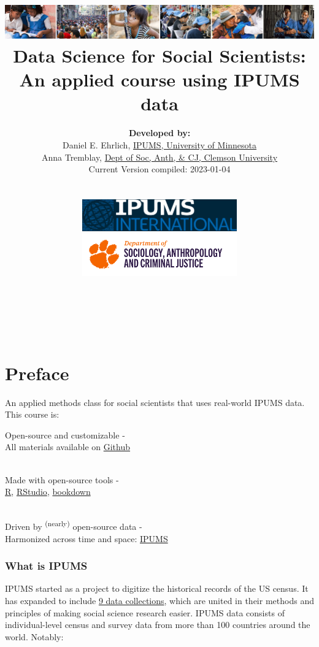 \documentclass[
]{book}
\title{\includegraphics{ipums_banner.png}\\
Data Science for Social Scientists:\\
An applied course using IPUMS data }
\author{\textbf{Developed by:}\\
\hspace*{0.333em}\hspace*{0.333em}Daniel E. Ehrlich, \href{https://international.ipums.org/international/}{IPUMS, University of Minnesota}\\
\hspace*{0.333em}\hspace*{0.333em}Anna Tremblay, \href{https://www.clemson.edu/cbshs/departments/sacj/degrees/anthropology.html}{Dept of Soc, Anth, \& CJ, Clemson University}\\
\hspace*{0.333em}\hspace*{0.333em}Current Version compiled: 2023-01-04\\
\strut \\
\includegraphics[width=0.5\textwidth,height=\textheight]{ipums_i_logo.jpg}\\
\includegraphics[width=0.5\textwidth,height=\textheight]{clemson_logo.png}\\
\strut \\
\strut \\}
\date{}
\begin{document}
\maketitle

{
\setcounter{tocdepth}{1}
\tableofcontents
}
\hypertarget{preface}{%
\chapter*{Preface}\label{preface}}

An applied methods class for social scientists that uses real-world IPUMS data. This course is:

Open-source and customizable -\\
\hspace*{0.333em}\hspace*{0.333em}\hspace*{0.333em}All materials available on \href{https://github.com/ehrlichd/stats_book}{Github}\\
\strut \\
Made with open-source tools -\\
\hspace*{0.333em}\hspace*{0.333em}\href{https://cran.r-project.org/}{R}, \href{https://www.rstudio.com/products/rstudio/}{RStudio}, \href{https://bookdown.org/}{bookdown}\\
\strut \\
Driven by \textsuperscript{(nearly)} open-source data -\\
\hspace*{0.333em}\hspace*{0.333em}Harmonized across time and space: \href{https://ipums.org}{IPUMS}\\

\hypertarget{what-is-ipums}{%
\subsection*{What is IPUMS}\label{what-is-ipums}}

IPUMS started as a project to digitize the historical records of the US census.
It has expanded to include \href{https://www.ipums.org/}{9 data collections},
which are united in their methods and principles of making social science
research easier. IPUMS data consists of individual-level census and survey data
from more than 100 countries around the world. Notably:
\end{document}
